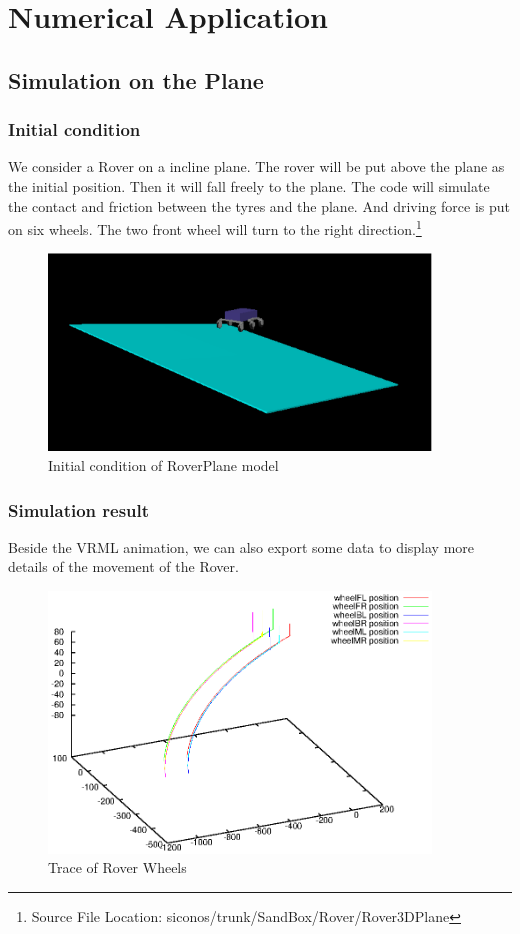\chapter{Numerical Application}
\section{Simulation on the Plane}
\subsection{Initial condition}
We consider a Rover on a incline plane. The rover will be put above the plane as the initial position. Then it will fall freely to the plane. The code will simulate the contact and friction between the tyres and the plane. And driving force is put on six wheels. The two front wheel will turn to the right direction.\footnote{Source File Location: siconos/trunk/SandBox/Rover/Rover3DPlane}
\begin{figure}[H]
 \begin{center}
      \includegraphics[width=4in]{Chapter5/roverepsplane.eps}
    \caption{Initial condition of RoverPlane model}
  \end{center}
\end{figure}



\subsection{Simulation result}
Beside the VRML animation, we can also export some data to display more details of the movement of the Rover.

\begin{figure}[H]
 \begin{center}
      \includegraphics[width=4in]{Chapter5/RoverPlane.eps}
    \caption{Trace of Rover Wheels}
  \end{center}
\end{figure}

